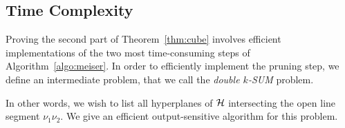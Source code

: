\subsection{Time Complexity}%
\label{paper:ksum-algorithm:contrib:time-complexity}

Proving the second part of Theorem~\ref{thm:cube} involves efficient implementations of
the two most time-consuming steps of Algorithm~\ref{algo:meiser}.
In order to efficiently implement the pruning
step, we define an intermediate problem, that we call the \emph{double $k$-SUM}
problem.


In other words, we wish to list all hyperplanes of $\mathcal{H}$
intersecting the open line segment $\nu_1\nu_2$.
We give an efficient output-sensitive algorithm for this problem.


